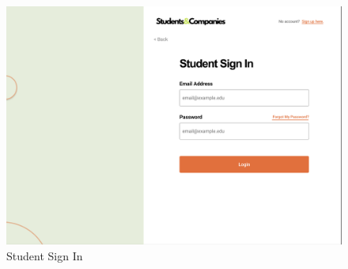\documentclass{article}
\begin{document}
\begin{figure}[H]
    \centering
    \includegraphics[scale = 0.40]{figures/UserInterfaces/General/StudentSignIn.png}
    \caption{Student Sign In}
     \centering
\end{figure}
\end{document}

